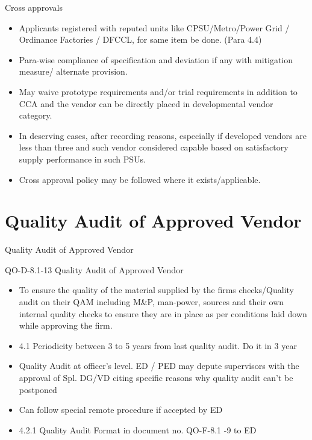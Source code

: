 \documentclass[
  10pt,
  ignorenonframetext,
  aspectratio=43,
]{beamer}
\begin{document}
\begin{frame}{Cross approvals}
\protect\hypertarget{cross-approvals}{}
\begin{itemize}
\item
  Applicants registered with reputed units like CPSU/Metro/Power Grid /
  Ordinance Factories / DFCCL, for same item be done. (Para 4.4)
\item
  Para-wise compliance of specification and deviation if any with
  mitigation measure/ alternate provision.
\item
  May waive prototype requirements and/or trial requirements in addition
  to CCA and the vendor can be directly placed in developmental vendor
  category.
\item
  In deserving cases, after recording reasons, especially if developed
  vendors are less than three and such vendor considered capable based
  on satisfactory supply performance in such PSUs.
\item
  Cross approval policy may be followed where it exists/applicable.
\end{itemize}
\end{frame}

\hypertarget{quality-audit-of-approved-vendor}{%
\section{Quality Audit of Approved
Vendor}\label{quality-audit-of-approved-vendor}}

\begin{frame}{Quality Audit of Approved Vendor}
\begin{block}{QO-D-8.1-13 Quality Audit of Approved Vendor}
\protect\hypertarget{qo-d-8.1-13-quality-audit-of-approved-vendor}{}
\begin{itemize}
\item
  To ensure the quality of the material supplied by the firms
  checks/Quality audit on their QAM including M\&P, man-power, sources
  and their own internal quality checks to ensure they are in place as
  per conditions laid down while approving the firm.
\item
  4.1 Periodicity between 3 to 5 years from last quality audit. Do it in
  3 year
\item
  Quality Audit at officer's level. ED / PED may depute supervisors with
  the approval of Spl. DG/VD citing specific reasons why quality audit
  can't be postponed
\item
  Can follow special remote procedure if accepted by ED
\item
  4.2.1 Quality Audit Format in document no. QO-F-8.1 -9 to ED
\end{itemize}
\end{block}
\end{frame}
\end{document}
